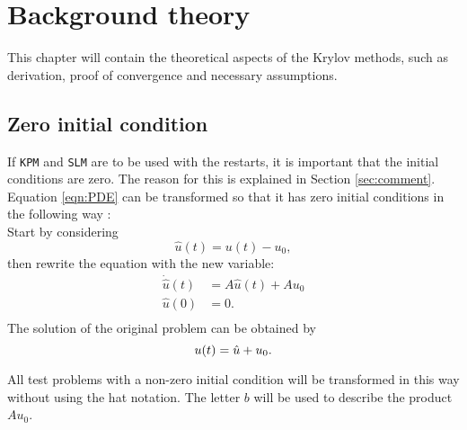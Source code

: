 \chapter{Background theory}
This chapter will contain the theoretical aspects of the Krylov methods, such as derivation, proof of convergence and necessary assumptions. 
 
\section{Zero initial condition}%
\label{sec:inittransf}
If \texttt{KPM} and \texttt{SLM} are to be used with the restarts, it is important that the initial conditions are zero. The reason for this is explained in Section \ref{sec:comment}. Equation \eqref{eqn:PDE} can be transformed so that it has zero initial conditions in the following way \cite{zerotransf}: \\

\noindent Start by considering
\begin{equation*}
\hat{u}(t) = u(t)-u_0,
\end{equation*}
then rewrite the equation with the new variable:
\begin{equation}
\begin{aligned}
\dot{\hat{u}}(t) &= A \hat{u}(t) +A u_0\\
 \hat{u}(0)&= 0. \\
\end{aligned}
\label{eqn:shiftedproblem}
\end{equation}
\noindent The solution of the original problem can be obtained by
\begin{equation*}
 u(t) = \hat{u} + u_0. \\
\end{equation*}


\noindent All test problems with a non-zero initial condition will be transformed in this way without using the hat notation. The letter $b$ will be used to describe the product $A u_0$.

